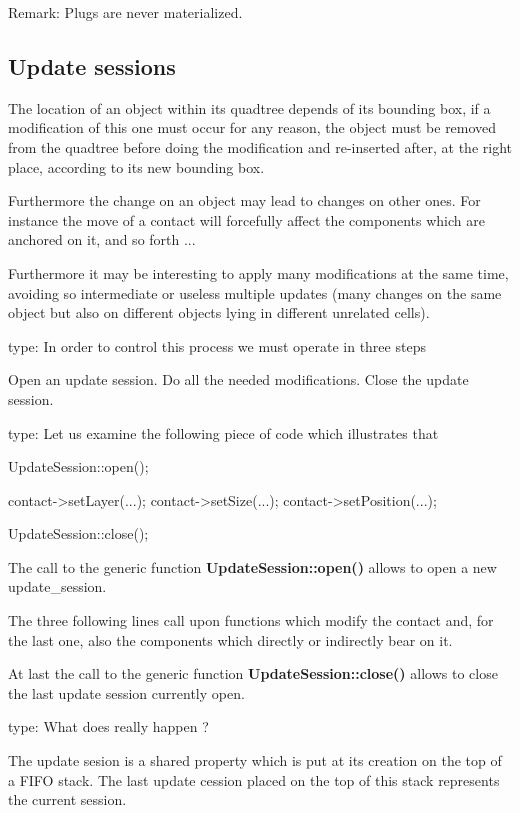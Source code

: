 \begin{DoxyParagraph}{Remark\+: Plugs are never materialized. }

\end{DoxyParagraph}
\hypertarget{classHurricane_1_1Go_secGoUpdateSessions}{}\subsection{Update sessions}\label{classHurricane_1_1Go_secGoUpdateSessions}
The location of an object within its quadtree depends of its bounding box, if a modification of this one must occur for any reason, the object must be removed from the quadtree before doing the modification and re-\/inserted after, at the right place, according to its new bounding box.

Furthermore the change on an object may lead to changes on other ones. For instance the move of a contact will forcefully affect the components which are anchored on it, and so forth ...

Furthermore it may be interesting to apply many modifications at the same time, avoiding so intermediate or useless multiple updates (many changes on the same object but also on different objects lying in different unrelated cells).

type\+: In order to control this process we must operate in three steps

Open an update session. Do all the needed modifications. Close the update session.

type\+: Let us examine the following piece of code which illustrates that 
\begin{DoxyCode}
UpdateSession::open();
 
contact->setLayer(...);
contact->setSize(...);
contact->setPosition(...);
 
UpdateSession::close();
\end{DoxyCode}
 The call to the generic function {\bfseries Update\+Session\+::open()} allows to open a new update\+\_\+session.

The three following lines call upon functions which modify the contact and, for the last one, also the components which directly or indirectly bear on it.

At last the call to the generic function {\bfseries Update\+Session\+::close()} allows to close the last update session currently open.

type\+: What does really happen ?

The update sesion is a shared property which is put at its creation on the top of a F\+I\+FO stack. The last update cession placed on the top of this stack represents the current session.

